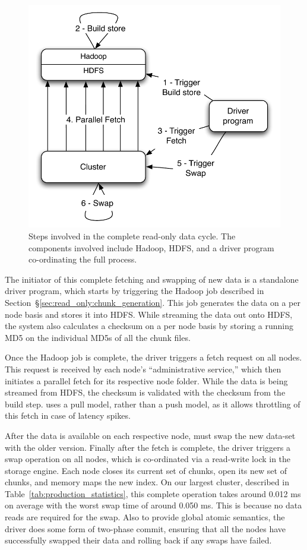 \begin{figure}
  \centering
    \includegraphics[scale=0.60]{images/cycle.pdf}
  \caption{Steps involved in the complete read-only data cycle. The components involved include Hadoop, HDFS, \projectname{} and a driver program co-ordinating the full process.}
  \label{cycle}
\end{figure}

The initiator of this complete fetching and swapping of new data is a
standalone driver program, which starts by triggering the Hadoop job
described in Section~\S\ref{sec:read_only:chunk_generation}. This job
generates the data on a per node basis and stores it into HDFS. While
streaming the data out onto HDFS, the system also calculates a
checksum on a per node basis by storing a running MD5 on the
individual MD5s of all the chunk files. 

Once the Hadoop job is complete, the driver triggers a fetch request
on all \projectname{} nodes. This request is received by each node's
``administrative service,'' which then initiates a parallel fetch for
its respective node folder. While the data is being streamed from
HDFS, the checksum is validated with the checksum from the build step.
\projectname{} uses a pull model, rather than a push model, as it allows
throttling of this fetch in case of latency spikes.

After the data is available on each respective node, \projectname{} must swap
the new data-set with the older version. Finally after the fetch is
complete, the driver triggers a swap operation on all nodes, which is
co-ordinated via a read-write lock in the storage engine. Each node
closes its current set of chunks, open its new set of chunks, and
memory maps the new index. On our largest cluster, described in Table~\ref{tab:production_statistics}, 
this complete operation takes around 0.012 ms on average with the worst 
swap time of around 0.050 ms. This is because no data reads are required 
for the swap. Also to provide global atomic semantics, the driver does
some form of two-phase commit, ensuring that all the nodes have successfully 
swapped their data and rolling back if any swaps have failed.

